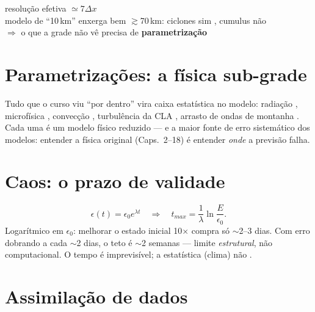 \documentclass[11pt]{article}
\begin{document}
\begin{noquadro}
resolução efetiva $\simeq 7\Delta x$\\
modelo de ``10\,km'' enxerga bem $\gtrsim$70\,km: ciclones sim
, cumulus não \\
$\Rightarrow$ o que a grade não vê precisa de \textbf{parametrização}
\end{noquadro}

\section{Parametrizações: a física sub-grade}\label{sec:param}

Tudo que o curso viu ``por dentro'' vira caixa estatística no modelo:
radiação , microfísica , convecção , turbulência da CLA
, arrasto de ondas de montanha
. Cada uma é um modelo físico reduzido — e a maior
fonte de erro sistemático dos modelos: entender a física original
(Caps.~2--18) é entender \emph{onde} a previsão falha.

\section{Caos: o prazo de validade}\label{sec:caos}


\begin{formadif}
\[ \epsilon(t) = \epsilon_0 e^{\lambda t}
\quad\Rightarrow\quad
t_{max} = \frac{1}{\lambda}\ln\frac{E}{\epsilon_0}. \]
Logarítmico em $\epsilon_0$: melhorar o estado inicial 10$\times$
compra só $\sim$2--3 dias. Com erro dobrando a cada $\sim$2 dias, o
teto é $\sim$2 semanas — limite \emph{estrutural}, não computacional.
O tempo é imprevisível; a estatística (clima) não
.
\end{formadif}

\section{Assimilação de dados}\label{sec:assim}

\end{document}
